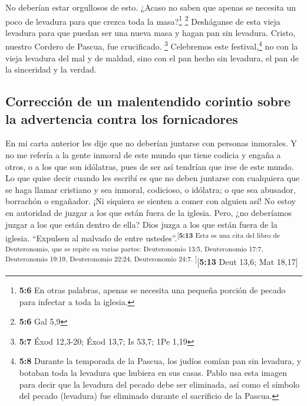  No deberían estar orgullosos de esto. ¿Acaso no saben que
apenas se necesita un poco de levadura para que crezca toda la
masa?\footnote{\textbf{5:6} En otras palabras, apenas se necesita una
  pequeña porción de pecado para infectar a toda la iglesia.}
\footnote{\textbf{5:6} Gal 5,9}  Desháganse de esta vieja
levadura para que puedan ser una nueva masa y hagan pan sin levadura.
Cristo, nuestro Cordero de Pascua, fue crucificado. \footnote{\textbf{5:7}
  Éxod 12,3-20; Éxod 13,7; Is 53,7; 1Pe 1,19}  Celebremos
este festival,\footnote{\textbf{5:8} Durante la temporada de la Pascua,
  los judíos comían pan sin levadura, y botaban toda la levadura que
  hubiera en sus casas. Pablo usa esta imagen para decir que la levadura
  del pecado debe ser eliminada, así como el símbolo del pecado
  (levadura) fue eliminado durante el sacrificio de la Pascua.} no con
la vieja levadura del mal y de maldad, sino con el pan hecho sin
levadura, el pan de la sinceridad y la verdad.

\hypertarget{correcciuxf3n-de-un-malentendido-corintio-sobre-la-advertencia-contra-los-fornicadores}{%
\subsection{Corrección de un malentendido corintio sobre la advertencia
contra los
fornicadores}\label{correcciuxf3n-de-un-malentendido-corintio-sobre-la-advertencia-contra-los-fornicadores}}

 En mi carta anterior les dije que no deberían juntarse
con personas inmorales.  Y no me refería a la gente
inmoral de este mundo que tiene codicia y engaña a otros, o a los que
son idólatras, pues de ser así tendrían que irse de este mundo.
 Lo que quise decir cuando les escribí es que no deben
juntarse con cualquiera que se haga llamar cristiano y sea inmoral,
codicioso, o idólatra; o que sea abusador, borrachón o engañador. ¡Ni
siquiera se sienten a comer con alguien así!  No estoy en
autoridad de juzgar a los que están fuera de la iglesia. Pero, ¿no
deberíamos juzgar a los que están dentro de ella?  Dios
juzga a los que están fuera de la iglesia. ``Expulsen al malvado de
entre ustedes''.\textsuperscript{{[}\textbf{5:13} Esta es una cita del
libro de Deuteronomio, que se repite en varias partes: Deuteronomio
13:5, Deuteronomio 17:7, Deuteronomio 19:19, Deuteronomio 22:24,
Deuteronomio 24:7. {]}}{[}\textbf{5:13} Deut 13,6; Mat 18,17{]}

